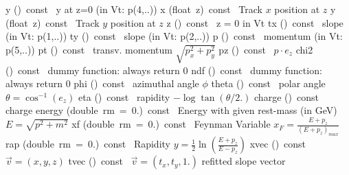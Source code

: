 \documentclass{article}
\begin{document}
\begin{cxxentry}
\begin{cxxclass}
\begin{cxxpublic}
        {y}
        {()\ const\ }
        {  y at z=0 (in Vt: p(4,..))}
        {}
\label{cxx.1.1.15}
        {x}
        {(float\ z)\ const\ }
        { Track $x$ position at $z$}
        {}
\label{cxx.1.1.16}
        {y}
        {(float\ z)\ const\ }
        { Track $y$ position at $z$}
        {}
\label{cxx.1.1.17}
        {z}
        {()\ const\ }
        { z = 0  in Vt}
        {}
\label{cxx.1.1.18}
        {tx}
        {()\ const\ }
        {  slope    (in Vt: p(1,..))}
        {}
\label{cxx.1.1.19}
        {ty}
        {()\ const\ }
        {  slope    (in Vt: p(2,..))}
        {}
\label{cxx.1.1.20}
        {p}
        {()\ const\ }
        { momentum (in Vt: p(5,..))}
        {}
\label{cxx.1.1.21}
        {pt}
        {()\ const\ }
        { transv. momentum $\sqrt{p_x^2 + p_y^2}$}
        {}
\label{cxx.1.1.22}
        {pz}
        {()\ const\ }
        { $p \cdot e_z$}
        {}
\label{cxx.1.1.23}
        {chi2}
        {()\ const\ }
        { dummy function: always return 0}
        {}
\label{cxx.1.1.24}
        {ndf}
        {()\ const\ }
        { dummy function: always return 0}
        {}
\label{cxx.1.1.25}
        {phi}
        {()\ const\ }
        { azimuthal angle $\phi$}
        {}
\label{cxx.1.1.26}
        {theta}
        {()\ const\ }
        { polar angle $\theta = \cos^{-1}(e_z)$}
        {}
\label{cxx.1.1.27}
        {eta}
        {()\ const\ }
        { rapidity $-\log\tan(\theta/2.)$}
        {}
\label{cxx.1.1.28}
        {charge}
        {()\ const\ }
        { charge}
        {}
\label{cxx.1.1.29}
        {energy}
        {(double\ rm\ =\ 0.)\ const\ }
        { Energy with given rest-mass (in GeV) $E = \sqrt{p^2 + m^2}$}
        {}
\label{cxx.1.1.30}
        {xf}
        {(double\ rm\ =\ 0.)\ const\ }
        { Feynman Variable $x_F = \frac{E+p_z}{(E+p_z)_{max}}$}
        {}
\label{cxx.1.1.31}
        {rap}
        {(double\ rm\ =\ 0.)\ const\ }
        { Rapidity $y = \frac{1}{2}\ln(\frac{E+p_z}{E-p_z})$}
        {}
\label{cxx.1.1.32}
        {xvec}
        {()\ const\ }
        { $\vec{v} = (x,y,z)$}
        {}
\label{cxx.1.1.33}
        {tvec}
        {()\ const\ }
        { $\vec{v} = (t_x,t_y,1.)$ refitted slope vector}
        {}

\end{cxxpublic}
\end{cxxclass}
\end{cxxentry}
\end{document}
